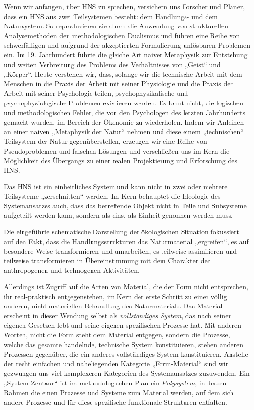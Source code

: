 \documentclass[11pt,a4paper]{article}
\begin{document}
Wenn wir anfangen, über HNS zu sprechen, versichern uns Forscher und Planer,
dass ein HNS aus zwei Teilsystemen besteht: dem Handlungs- und dem
Natursystem.  So reproduzieren sie durch die Anwendung von strukturellen
Analysemethoden den methodologischen Dualismus und führen eine Reihe von
schwerfälligen und aufgrund der akzeptierten Formulierung unlösbaren Problemen
ein. Im 19. Jahrhundert führte die gleiche Art naiver Metaphysik zur
Entstehung und weiten Verbreitung des Problems des Verhältnisses von „Geist“
und „Körper“. Heute verstehen wir, dass, solange wir die technische Arbeit mit
dem Menschen in die Praxis der Arbeit mit seiner Physiologie und die Praxis
der Arbeit mit seiner Psychologie teilen, psychophysikalische und
psychophysiologische Problemen existieren werden. Es lohnt nicht, die
logischen und methodologischen Fehler, die von den Psychologen des letzten
Jahrhunderts gemacht wurden, im Bereich der Ökonomie zu wiederholen.  Indem
wir Anleihen an einer naiven „Metaphysik der Natur“ nehmen und diese einem
„technischen“ Teilsystem der Natur gegenüberstellen, erzeugen wir eine Reihe
von Pseudoproblemen und falschen Lösungen und verschließen uns im Kern die
Möglichkeit des Übergangs zu einer realen Projektierung und Erforschung des
HNS.

Das HNS ist ein einheitliches System und kann nicht in zwei oder mehrere
Teilsysteme „zerschnitten“ werden. Im Kern behauptet die Ideologie des
Systemansatzes auch, dass das betreffende Objekt nicht in Teile und Subsysteme
aufgeteilt werden kann, sondern als eins, als Einheit genonnen werden muss.

Die eingeführte schematische Darstellung der ökologischen Situation fokussiert
auf den Fakt, dass die Handlungsstrukturen das Naturmaterial „ergreifen“, es
auf besondere Weise transformieren und umarbeiten, es teilweise assimilieren
und teilweise transformieren in Übereinstim\-mung mit dem Charakter der
anthropogenen und technogenen Aktivitäten.

Allerdings ist Zugriff auf die Arten von Material, die der Form nicht
entsprechen, ihr real-praktisch entgegenstehen, im Kern der erste Schritt zu
einer völlig anderen, nicht-materiellen Behandlung des Naturmaterials. Das
Material erscheint in dieser Wendung selbst als \emph{vollstän\-diges System},
das nach seinen eigenen Gesetzen lebt und seine eigenen spezifischen Prozesse
hat. Mit anderen Worten, nicht die Form steht dem Material entgegen, sondern
die Prozesse, welche das gesamte handelnde, technische System konstituieren,
stehen anderen Prozessen gegenüber, die ein anderes vollständiges System
konstituieren.  Anstelle der recht einfachen und naheliegenden Kategorie
„Form-Material“ sind wir gezwungen uns viel komplexeren Kategorien des
Systemansatzes zuzuwenden.  Ein „System-Zentaur“ ist im methodologischen Plan
ein \emph{Polysystem}, in dessen Rahmen die einen Prozesse und Systeme zum
Material werden, auf dem sich andere Prozesse und für diese spezifische
funktionale Strukturen entfalten.
\end{document}
